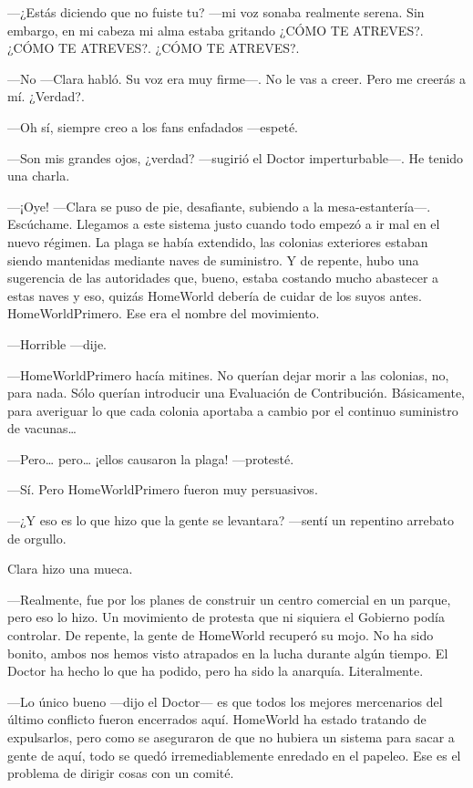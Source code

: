 ---¿Estás diciendo que no fuiste tu? ---mi voz sonaba realmente serena.
Sin embargo, en mi cabeza mi alma estaba gritando ¿CÓMO TE ATREVES?.
¿CÓMO TE ATREVES?. ¿CÓMO TE ATREVES?.

---No ---Clara habló. Su voz era muy firme---. No le vas a creer. Pero
me creerás a mí. ¿Verdad?.

---Oh sí, siempre creo a los fans enfadados ---espeté.

---Son mis grandes ojos, ¿verdad? ---sugirió el Doctor imperturbable---.
He tenido una charla.

---¡Oye! ---Clara se puso de pie, desafiante, subiendo a la
mesa-estantería---. Escúchame. Llegamos a este sistema justo cuando todo
empezó a ir mal en el nuevo régimen. La plaga se había extendido, las
colonias exteriores estaban siendo mantenidas mediante naves de
suministro. Y de repente, hubo una sugerencia de las autoridades que,
bueno, estaba costando mucho abastecer a estas naves y eso, quizás
HomeWorld debería de cuidar de los suyos antes. HomeWorldPrimero. Ese
era el nombre del movimiento.

---Horrible ---dije.

---HomeWorldPrimero hacía mitines. No querían dejar morir a las
colonias, no, para nada. Sólo querían introducir una Evaluación de
Contribución. Básicamente, para averiguar lo que cada colonia aportaba a
cambio por el continuo suministro de vacunas\ldots{}

---Pero\ldots{} pero\ldots{} ¡ellos causaron la plaga! ---protesté.

---Sí. Pero HomeWorldPrimero fueron muy persuasivos.

---¿Y eso es lo que hizo que la gente se levantara? ---sentí un
repentino arrebato de orgullo.

Clara hizo una mueca.

---Realmente, fue por los planes de construir un centro comercial en un
parque, pero eso lo hizo. Un movimiento de protesta que ni siquiera el
Gobierno podía controlar. De repente, la gente de HomeWorld recuperó su
mojo. No ha sido bonito, ambos nos hemos visto atrapados en la lucha
durante algún tiempo. El Doctor ha hecho lo que ha podido, pero ha sido
la anarquía. Literalmente.

---Lo único bueno ---dijo el Doctor--- es que todos los mejores
mercenarios del último conflicto fueron encerrados aquí. HomeWorld ha
estado tratando de expulsarlos, pero como se aseguraron de que no
hubiera un sistema para sacar a gente de aquí, todo se quedó
irremediablemente enredado en el papeleo. Ese es el problema de dirigir
cosas con un comité.

